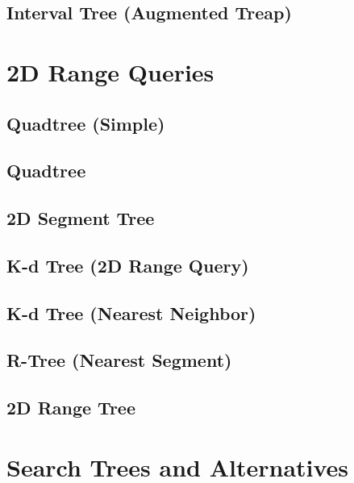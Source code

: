 \subsection{Interval Tree (Augmented Treap)}


\section{2D Range Queries}
\setcounter{section}{4}
\setcounter{subsection}{0}
\subsection{Quadtree (Simple)}

\subsection{Quadtree}

\subsection{2D Segment Tree}

\subsection{K-d Tree (2D Range Query)}

\subsection{K-d Tree (Nearest Neighbor)}

\subsection{R-Tree (Nearest Segment)}

\subsection{2D Range Tree}


\section{Search Trees and Alternatives}
\setcounter{section}{5}
\setcounter{subsection}{0}
